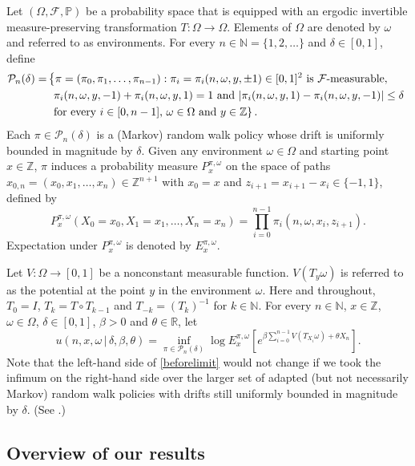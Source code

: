 \documentclass[a4paper]{amsart}
\numberwithin{equation}{section}
\theoremstyle{plain}
\theoremstyle{remark}
\begin{document}
Let $(\Omega,\mathcal{F},\mathbb{P})$ be a probability space that is equipped with an ergodic invertible measure-preserving transformation $T:\Omega\to\Omega$. Elements of $\Omega$ are denoted by $\omega$ and referred to as environments. For every $n\in\mathbb{N} = \{1,2,\ldots\}$ and $\delta\in[0,1]$, define
\begin{align*}
\mathcal{P}_n(\delta) = &\left\{\pi = (\pi_0,\pi_1,\ldots,\pi_{n-1}):\pi_i = 
\pi_i(n,\omega,y,\pm 1)\in[0,1]^2 \ 
{}{\mbox{\rm is $\mathcal{F}$-measurable}},\right.\\
&\left. \ \pi_i(n,\omega,y,-1) + \pi_i(n,\omega,y,1) = 1\ \text{and}
\ |\pi_i(n,\omega,y,1) - \pi_i(n,\omega,y,-1)|\le\delta\ \right.\\
&\left. \ \text{for every $i\in[0,n-1]$, $\omega\in\Omega$ and $y\in\mathbb{Z}$}\right\}.
\end{align*}
Each $\pi\in\mathcal{P}_n(\delta)$ is a (Markov) random walk policy whose drift is uniformly bounded in magnitude by $\delta$. Given any environment $\omega\in\Omega$ and starting point $x\in\mathbb{Z}$, $\pi$ induces a probability measure $P_x^{\pi,\omega}$ on the space of paths $x_{0,n} = (x_0,x_1,\ldots,x_n)\in\mathbb{Z}^{n+1}$ with $x_0 = x$ and $z_{i+1} = x_{i+1} - x_{i}\in \{-1,1\}$, defined by
$$P_x^{\pi,\omega}(X_0 = x_0, X_1 = x_1,\ldots, X_n = x_n) = \prod_{i=0}^{n-1}\pi_i(n,\omega,x_i,z_{i+1}).$$
Expectation under $P_x^{\pi,\omega}$ is denoted by $E_x^{\pi,\omega}$.

Let $V:\Omega\to[0,1]$ be a nonconstant measurable function. $V(T_y\omega)$ is referred to as the potential at the point $y$ in the environment $\omega$. Here and throughout, $T_0 = I$, $T_k = T\circ T_{k-1}$ and $T_{-k} = (T_k)^{-1}$ for $k\in\mathbb{N}$. For every $n\in\mathbb{N}$, $x\in\mathbb{Z}$, $\omega\in\Omega$, $\delta\in[0,1]$, $\beta > 0$ and $\theta\in\mathbb{R}$, let
\begin{equation}\label{beforelimit}
u(n,x,\omega\,|\,\delta,\beta,\theta) = \inf_{\pi\in\mathcal{P}_n(\delta)}\log E_x^{\pi,\omega}\left[e^{\beta\sum_{i=0}^{n-1}V(T_{X_i}\omega) + \theta X_n}\right].
\end{equation}
Note that the left-hand side of \eqref{beforelimit} would not change if we took the infimum on the right-hand side over the larger set of adapted (but not necessarily Markov) random walk policies with drifts still uniformly bounded in magnitude by $\delta$. 
(See \cite[Proposition 11.7]{BerShr1978}.) 

\subsection{Overview of our results}\label{kereviziyi}
\end{document}
